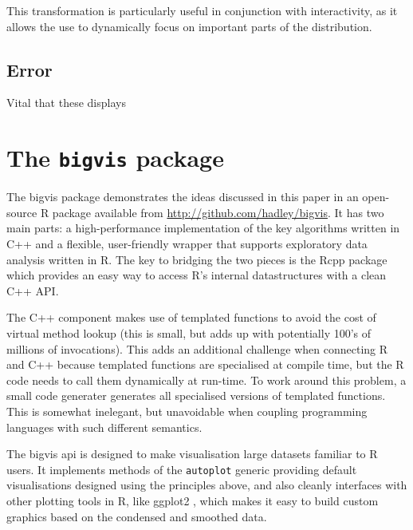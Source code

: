 \documentclass[journal]{vgtc}                %
\begin{document}
This transformation is particularly useful in conjunction with interactivity, as it allows the use to dynamically focus on important parts of the distribution.

\subsection{Error}

Vital that these displays

\section{The {\tt bigvis} package}
\label{sec:bigvis}

The bigvis package demonstrates the ideas discussed in this paper in an open-source R package available from \url{http://github.com/hadley/bigvis}. It has two main parts: a high-performance implementation of the key algorithms written in C++ and a flexible, user-friendly wrapper that supports exploratory data analysis written in R. The key to bridging the two pieces is the Rcpp package \citep{eddelbuettel:2011} which provides an easy way to access R's internal datastructures with a clean C++ API. 

The C++ component makes use of templated functions to avoid the cost of virtual method lookup (this is small, but adds up with potentially 100's of millions of invocations). This adds an additional challenge when connecting R and C++ because templated functions are specialised at compile time, but the R code needs to call them dynamically at run-time. To work around this problem, a small code generater generates all specialised versions of templated functions. This is somewhat inelegant, but unavoidable when coupling programming languages with such different semantics.

The bigvis {\sc api} is designed to make visualisation large datasets familiar to R users. It implements methods of the {\tt autoplot} generic providing default visualisations designed using the principles above, and also cleanly interfaces with other plotting tools in R, like ggplot2 \citep{me:ggplot2,wickham:2007d}, which makes it easy to build custom graphics based on the condensed and smoothed data.
\end{document}
